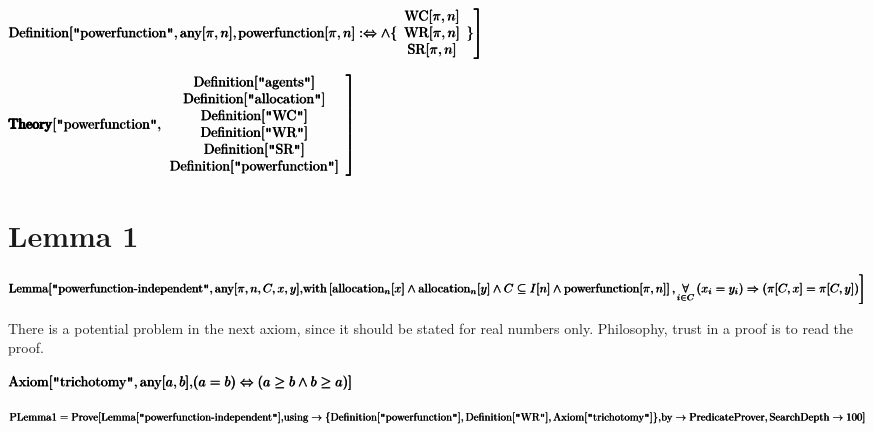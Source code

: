 \documentclass{article}
\begin{document}
\noindent\(\pmb{}\\
\pmb{\text{Definition}[\text{$\texttt{"}$powerfunction$\texttt{"}$}, \text{any}[\pi ,n],}\\
\pmb{\left.\text{powerfunction}[\pi ,n] :\Leftrightarrow  \land \{
\begin{array}{c}
 \text{WC}[\pi ,n] \\
 \text{WR}[\pi ,n] \\
 \text{SR}[\pi ,n]
\end{array}
\} \right]}\)

\noindent\(\pmb{\pmb{\text{Theory}}[\text{$\texttt{"}$powerfunction$\texttt{"}$},}\\
\pmb{\left.
\begin{array}{c}
 \text{Definition}[\text{$\texttt{"}$agents$\texttt{"}$}] \\
 \text{Definition}[\text{$\texttt{"}$allocation$\texttt{"}$}] \\
 \text{Definition}[\text{$\texttt{"}$WC$\texttt{"}$}] \\
 \text{Definition}[\text{$\texttt{"}$WR$\texttt{"}$}] \\
 \text{Definition}[\text{$\texttt{"}$SR$\texttt{"}$}] \\
 \text{Definition}[\text{$\texttt{"}$powerfunction$\texttt{"}$}]
\end{array}
\right]}\)

\section*{Lemma 1}

\noindent\(\pmb{\text{Lemma}[\text{$\texttt{"}$powerfunction-independent$\texttt{"}$}, \text{any}[\pi ,n,C,x,y],}\\
\pmb{\text{with}\left[\text{allocation}_n[x] \land  \text{allocation}_n[y]\land C\subseteq  I[n]\land  \text{powerfunction}[\pi ,n]\right],}\\
\pmb{\left.\underset{i\in  C}{\forall }\left(x_i= y_i\right) \Rightarrow  (\pi [C,x] = \pi [C,y])\right]}\)

There is a potential problem in the next axiom, since it should be stated for real numbers only. Philosophy, trust in a proof is to read the proof.

\noindent\(\pmb{\text{Axiom}[\text{$\texttt{"}$trichotomy$\texttt{"}$},\text{any}[a,b],}\\
\pmb{(a=b)\Leftrightarrow (a\geq b\land b\geq a)]}\)

\noindent\(\pmb{\text{PLemma1}=\text{Prove}[\text{Lemma}[\text{$\texttt{"}$powerfunction-independent$\texttt{"}$}],}\\
\pmb{\text{using}\to \{\text{Definition}[\text{$\texttt{"}$powerfunction$\texttt{"}$}],\text{Definition}[\text{$\texttt{"}$WR$\texttt{"}$}],\text{Axiom}[\text{$\texttt{"}$trichotomy$\texttt{"}$}]\},}\\
\pmb{\text{by}\to \text{PredicateProver},\text{SearchDepth}\to 100]}\)
\end{document}
